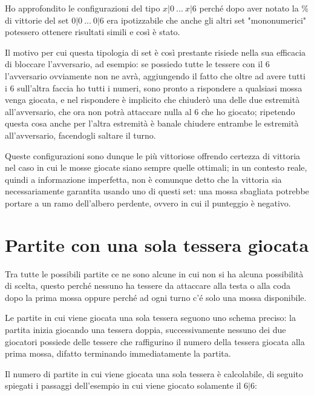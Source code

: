 \documentclass[a4paper,12pt]{report}
\begin{document}
Ho approfondito le configurazioni del tipo \(x|0\ ...\ x|6\) perché dopo aver notato la \% di vittorie del set \(0|0\ ...\ 0|6\) era ipotizzabile che anche gli altri set "mononumerici" potessero ottenere risultati simili e così è stato.

Il motivo per cui questa tipologia di set è così prestante risiede nella sua efficacia di bloccare l'avversario, ad esempio: se possiedo tutte le tessere con il 6 l'avversario ovviamente non ne avrà, aggiungendo il fatto che oltre ad avere tutti i 6 sull'altra faccia ho tutti i numeri, sono pronto a rispondere a qualsiasi mossa venga giocata, e nel rispondere è implicito che chiuderò una delle due estremità all'avversario, che ora non potrà attaccare nulla al 6 che ho giocato; ripetendo questa cosa anche per l'altra estremità è banale chiudere entrambe le estremità all'avversario, facendogli saltare il turno.

Queste configurazioni sono dunque le più vittoriose offrendo certezza di vittoria nel caso in cui le mosse giocate siano sempre quelle ottimali; in un contesto reale, quindi a informazione imperfetta, non è comunque detto che la vittoria sia necessariamente garantita usando uno di questi set: una mossa sbagliata potrebbe portare a un ramo dell'albero perdente, ovvero in cui il punteggio è negativo.


\section{Partite con una sola tessera giocata}

Tra tutte le possibili partite ce ne sono alcune in cui non si ha alcuna possibilità di scelta, questo perché nessuno ha tessere da attaccare alla testa o alla coda dopo la prima mossa oppure perché ad ogni turno c'é solo una mossa disponibile.

Le partite in cui viene giocata una sola tessera seguono uno schema preciso: la partita inizia giocando una tessera doppia, successivamente nessuno dei due giocatori possiede delle tessere che raffigurino il numero della tessera giocata alla prima mossa, difatto terminando immediatamente la partita.

Il numero di partite in cui viene giocata una sola tessera è calcolabile, di seguito spiegati i passaggi dell'esempio in cui viene giocato solamente il \(6|6\):
\end{document}
